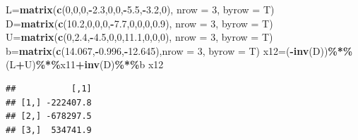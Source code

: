 \documentclass[
]{article}
\newenvironment{Shaded}{\begin{snugshade}}{\end{snugshade}}
\newcommand{\AttributeTok}[1]{\textcolor[rgb]{0.13,0.29,0.53}{#1}}
\newcommand{\DecValTok}[1]{\textcolor[rgb]{0.00,0.00,0.81}{#1}}
\newcommand{\FloatTok}[1]{\textcolor[rgb]{0.00,0.00,0.81}{#1}}
\newcommand{\FunctionTok}[1]{\textcolor[rgb]{0.13,0.29,0.53}{\textbf{#1}}}
\newcommand{\NormalTok}[1]{#1}
\newcommand{\OtherTok}[1]{\textcolor[rgb]{0.56,0.35,0.01}{#1}}
\newcommand{\SpecialCharTok}[1]{\textcolor[rgb]{0.81,0.36,0.00}{\textbf{#1}}}
\begin{document}
\begin{Shaded}
\begin{Highlighting}[]
\NormalTok{  L}\OtherTok{=}\FunctionTok{matrix}\NormalTok{(}\FunctionTok{c}\NormalTok{(}\DecValTok{0}\NormalTok{,}\DecValTok{0}\NormalTok{,}\DecValTok{0}\NormalTok{,}\SpecialCharTok{{-}}\FloatTok{2.3}\NormalTok{,}\DecValTok{0}\NormalTok{,}\DecValTok{0}\NormalTok{,}\SpecialCharTok{{-}}\FloatTok{5.5}\NormalTok{,}\SpecialCharTok{{-}}\FloatTok{3.2}\NormalTok{,}\DecValTok{0}\NormalTok{), }\AttributeTok{nrow =} \DecValTok{3}\NormalTok{, }\AttributeTok{byrow =}\NormalTok{ T)}
\NormalTok{  D}\OtherTok{=}\FunctionTok{matrix}\NormalTok{(}\FunctionTok{c}\NormalTok{(}\FloatTok{10.2}\NormalTok{,}\DecValTok{0}\NormalTok{,}\DecValTok{0}\NormalTok{,}\DecValTok{0}\NormalTok{,}\SpecialCharTok{{-}}\FloatTok{7.7}\NormalTok{,}\DecValTok{0}\NormalTok{,}\DecValTok{0}\NormalTok{,}\DecValTok{0}\NormalTok{,}\FloatTok{0.9}\NormalTok{), }\AttributeTok{nrow =} \DecValTok{3}\NormalTok{, }\AttributeTok{byrow =}\NormalTok{ T)}
\NormalTok{  U}\OtherTok{=}\FunctionTok{matrix}\NormalTok{(}\FunctionTok{c}\NormalTok{(}\DecValTok{0}\NormalTok{,}\FloatTok{2.4}\NormalTok{,}\SpecialCharTok{{-}}\FloatTok{4.5}\NormalTok{,}\DecValTok{0}\NormalTok{,}\DecValTok{0}\NormalTok{,}\FloatTok{11.1}\NormalTok{,}\DecValTok{0}\NormalTok{,}\DecValTok{0}\NormalTok{,}\DecValTok{0}\NormalTok{), }\AttributeTok{nrow =} \DecValTok{3}\NormalTok{, }\AttributeTok{byrow =}\NormalTok{ T)}
\NormalTok{  b}\OtherTok{=}\FunctionTok{matrix}\NormalTok{(}\FunctionTok{c}\NormalTok{(}\FloatTok{14.067}\NormalTok{,}\SpecialCharTok{{-}}\FloatTok{0.996}\NormalTok{,}\SpecialCharTok{{-}}\FloatTok{12.645}\NormalTok{),}\AttributeTok{nrow =} \DecValTok{3}\NormalTok{, }\AttributeTok{byrow =}\NormalTok{ T)}
\NormalTok{  x12}\OtherTok{=}\NormalTok{(}\SpecialCharTok{{-}}\FunctionTok{inv}\NormalTok{(D))}\SpecialCharTok{\%*\%}\NormalTok{(L}\SpecialCharTok{+}\NormalTok{U)}\SpecialCharTok{\%*\%}\NormalTok{x11}\SpecialCharTok{+}\FunctionTok{inv}\NormalTok{(D)}\SpecialCharTok{\%*\%}\NormalTok{b}
\NormalTok{  x12}
\end{Highlighting}
\end{Shaded}

\begin{verbatim}
##           [,1]
## [1,] -222407.8
## [2,] -678297.5
## [3,]  534741.9
\end{verbatim}
\end{document}
